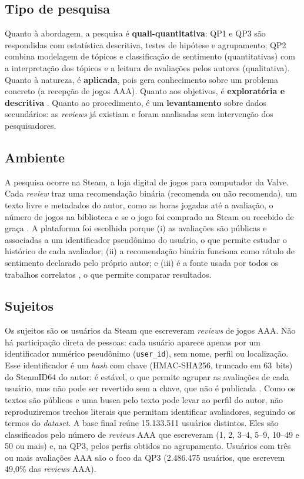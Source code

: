 \documentclass[12pt]{article}
\newcommand{\NUSU}{15.133.511}
\newcommand{\NUSUtres}{2.486.475}
\newcommand{\PUSUtres}{49,0\%}
\begin{document}
\subsection{Tipo de pesquisa}

Quanto à abordagem, a pesquisa é \textbf{quali-quantitativa}: QP1 e QP3 são respondidas com
estatística descritiva, testes de hipótese e agrupamento; QP2 combina modelagem de tópicos e
classificação de sentimento (quantitativas) com a interpretação dos tópicos e a leitura de
avaliações pelos autores (qualitativa). Quanto à natureza,
é \textbf{aplicada}, pois gera conhecimento sobre um problema concreto (a recepção de jogos AAA).
Quanto aos objetivos, é \textbf{exploratória e descritiva} \cite{gil2002}. Quanto ao
procedimento, é um \textbf{levantamento} sobre dados secundários: as \textit{reviews} já
existiam e foram analisadas sem intervenção dos pesquisadores.

\subsection{Ambiente}

A pesquisa ocorre na Steam, a loja digital de jogos para computador da Valve. Cada
\textit{review} traz uma recomendação binária (recomenda ou não recomenda), um texto livre e
metadados do autor, como as horas jogadas até a avaliação, o número de jogos na biblioteca e se o
jogo foi comprado na Steam ou recebido de graça \cite{steamapi}. A plataforma foi escolhida
porque (i) as avaliações são públicas e associadas a um identificador pseudônimo do usuário, o que
permite estudar o histórico de cada avaliador; (ii) a recomendação binária funciona como rótulo
de sentimento declarado pelo próprio autor; e (iii) é a fonte usada por todos os trabalhos
correlatos \cite{bazzaz2026,byers2025,petrosino2022,gibrim2026,jorge2023,ferreira2026,lei2025},
o que permite comparar resultados.

\subsection{Sujeitos}

Os sujeitos são os usuários da Steam que escreveram \textit{reviews} de jogos AAA. Não há
participação direta de pessoas: cada usuário aparece apenas por um identificador numérico
pseudônimo (\texttt{user\_id}), sem nome, perfil ou localização. Esse identificador é um \textit{hash} com chave (HMAC-SHA256, truncado em 63~bits) do SteamID64 do autor: é estável, o que permite agrupar as avaliações de cada usuário, mas não pode ser revertido sem a chave, que não é publicada \cite{dataset}. Como os textos são públicos e uma busca pelo texto pode levar ao perfil do autor, não reproduziremos trechos literais que permitam identificar avaliadores, seguindo os termos do \textit{dataset}. A base final reúne \NUSU{} usuários
distintos. Eles são classificados pelo número de \textit{reviews} AAA que escreveram (1, 2, 3--4,
5--9, 10--49 e 50 ou mais) e, na QP3, pelos perfis obtidos no agrupamento. Usuários com
três ou mais avaliações AAA são o foco da QP3 (\NUSUtres{} usuários, que escrevem
\PUSUtres{} das \textit{reviews} AAA).
\end{document}
